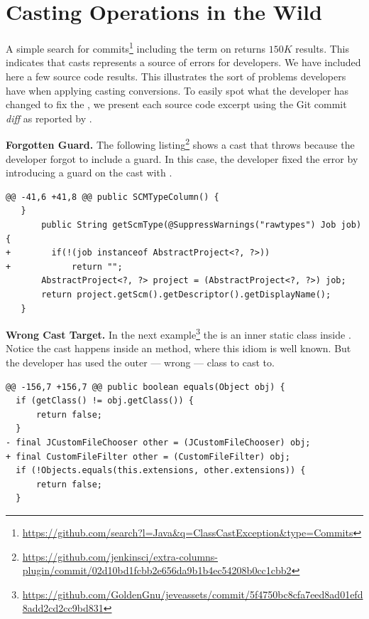 
\newcommand{\ctag}[1]{\textsl{#1}}
\newcommand{\cpattern}[1]{\textsc{#1}}

\chapter{Casting Operations in the Wild}
\label{cha:casts}

A simple search for
commits\footnote{\url{https://github.com/search?l=Java&q=ClassCastException&type=Commits}}
including the term  on \github{} returns \circa{} $150K$
results.
This indicates that casts represents a source of errors for developers.
We have included here a few source code results.
This illustrates the sort of problems developers have when applying casting conversions.
To easily spot what the developer has changed to fix the ,
we present each source code excerpt using the Git commit \emph{diff} as reported by \github{}.

\textbf{Forgotten Guard.}
The following listing\footnote{\url{https://github.com/jenkinsci/extra-columns-plugin/commit/02d10bd1fcbb2e656da9b1b4ec54208b0cc1cbb2}}
shows a cast that throws  because the developer forgot to include a guard.
In this case, the developer fixed the error by introducing a guard on the cast with .

\begin{lstlisting}[style=java]
@@ -41,6 +41,8 @@ public SCMTypeColumn() {
   }
       public String getScmType(@SuppressWarnings("rawtypes") Job job) {
+        if(!(job instanceof AbstractProject<?, ?>))
+            return "";
       AbstractProject<?, ?> project = (AbstractProject<?, ?>) job;
       return project.getScm().getDescriptor().getDisplayName();
   }
\end{lstlisting}

\textbf{Wrong Cast Target.}
In the next example\footnote{\url{https://github.com/GoldenGnu/jeveassets/commit/5f4750bc8cfa7eed8ad01efd8add2cd2cc9bd831}}
the  is an inner static class inside .
Notice the cast happens inside an  method, where this idiom is well known.
But the developer has used the outer --- wrong --- class to cast to.

\begin{lstlisting}[style=java]
@@ -156,7 +156,7 @@ public boolean equals(Object obj) {
  if (getClass() != obj.getClass()) {
      return false;
  }
- final JCustomFileChooser other = (JCustomFileChooser) obj;
+ final CustomFileFilter other = (CustomFileFilter) obj;
  if (!Objects.equals(this.extensions, other.extensions)) {
      return false;
  }
\end{lstlisting}

